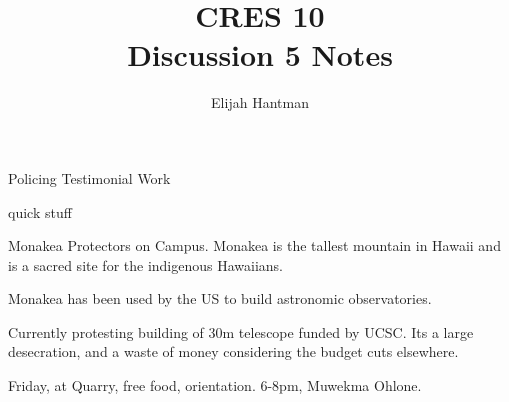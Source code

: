 \documentclass{report}
\title{\Huge{CRES 10}\\Discussion 5 Notes}
\author{\huge{Elijah Hantman}}
\date{}
\begin{document}
\maketitle
\newpage

\begin{description}
    \item {\large Policing Testimonial Work}
    \item quick stuff
        \begin{mdframed}
            Monakea Protectors on Campus. Monakea is the
            tallest mountain in Hawaii and is a sacred
            site for the indigenous Hawaiians.

            Monakea has been used by the US to build
            astronomic observatories.

            Currently protesting building of 30m telescope
            funded by UCSC. Its a large desecration,
            and a waste of money considering the budget
            cuts elsewhere.


            Friday, at Quarry, free food, orientation.
            6-8pm, Muwekma Ohlone.
        \end{mdframed}
\end{description}
\end{document}
